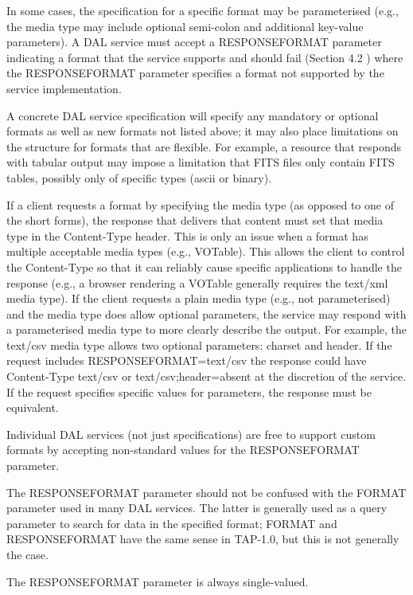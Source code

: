 \documentclass[11pt,letter]{ivoa}
\begin{document}
In some cases, the specification for a specific format may be parameterised 
(e.g., the media type may include optional semi-colon and additional key-value 
parameters). A DAL service must accept a RESPONSEFORMAT parameter indicating a 
format that the service supports and should  fail (Section 4.2 ) where the 
RESPONSEFORMAT parameter specifies a format not supported by the service 
implementation.

A concrete DAL service specification will specify any mandatory or optional 
formats as well as new formats not listed above; it may also place limitations 
on the structure for formats that are flexible.  For example, a resource that 
responds with tabular output may impose a limitation that FITS files only 
contain FITS tables, possibly only of specific types (ascii or binary).

If a client requests a format by specifying the media type (as opposed to one of 
the short forms), the response that delivers that content must set that
media type 
in the Content-Type header. This is only an issue when a format has multiple 
acceptable media types (e.g., VOTable). This allows the client to control the 
Content-Type so that it can reliably cause specific applications to handle the 
response (e.g., a browser rendering a VOTable generally requires the text/xml 
media type). If the client requests a plain media type (e.g., not parameterised) and 
the media type does allow optional parameters, the service may respond with a 
parameterised media type to more clearly describe the output. For example, the 
text/csv media type allows two optional parameters: charset and header. If the 
request includes RESPONSEFORMAT=text/csv the response could have Content-Type 
text/csv or text/csv;header=absent at the discretion of the service. If the 
request specifies specific values for parameters, the response must be 
equivalent.

Individual DAL services (not just specifications) are free to support custom 
formats by accepting non-standard values for the RESPONSEFORMAT parameter.

The RESPONSEFORMAT parameter should not be confused with the FORMAT parameter 
used in many DAL services. The latter is generally used as a query parameter to 
search for data in the specified format; FORMAT and RESPONSEFORMAT have the same 
sense in TAP-1.0, but this is not generally the case.

The RESPONSEFORMAT parameter is always single-valued.
\end{document}
